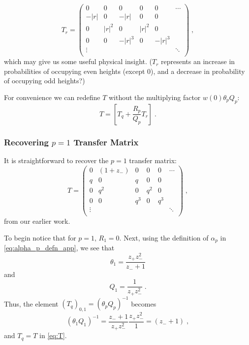 \documentclass[a4paper,10pt]{article}
\begin{document}
\begin{equation}
  T_r = \begin{pmatrix}
         0      & 0     & 0      & 0      & 0      & \cdots \\
         -|r|      & 0     & -|r|      & 0      & 0      &        \\
         0      & |r|^2   & 0      & |r|^2    & 0      &        \\
         0      & 0     & -|r|^3    & 0      & -|r|^3    &        \\
         \vdots &       &        &        &        & \ddots \\
        \end{pmatrix} \;,
\end{equation}
which may give us some useful physical insight. ($T_r$ represents an increase in probabilities of occupying even heights (except 0), and a decrease in probability of occupying odd heights?)

For convenience we can redefine $T$ without the multiplying factor $w(0)\theta_p Q_p$:
\begin{equation}
  T = \left[ T_q + \frac{R_p}{Q_p} T_r \right] \;.
\end{equation}

\subsubsection{Recovering $p=1$ Transfer Matrix}

It is straightforward to recover the $p=1$ transfer matrix:
\begin{equation}\label{eq:T}
  T = \begin{pmatrix}
       0      & (1+z_-)& 0      & 0      & 0      & \cdots \\
       q      & 0      & q      & 0      & 0      &        \\
       0      & q^2    & 0      & q^2    & 0      &        \\
       0      & 0      & q^3    & 0      & q^3    &        \\
       \vdots &        &        &        &        & \ddots \\
      \end{pmatrix} \;,
\end{equation}
from our earlier work.

To begin notice that for $p=1$, $R_1 = 0$. Next, using the definition of $\alpha_p$ in \eqref{eq:alpha_p_defn_app}, we see that 
\begin{equation}
  \theta_1 = \frac{z_+ z_-^2}{z_-+1} 
\end{equation}
and
\begin{equation}
 Q_1 = \frac{1}{z_+z_-^2} \;.
\end{equation}
Thus, the element $(T_q)_{0,1} = (\theta_p Q_p)^{-1}$ becomes
\begin{equation}
 (\theta_1 Q_1)^{-1}= \frac{z_-+1}{z_+ z_-^2} \frac{z_+z_-^2}{1} = (z_- + 1) \;, 
\end{equation}
and $T_q = T$ in \eqref{eq:T}. 
\end{document}
